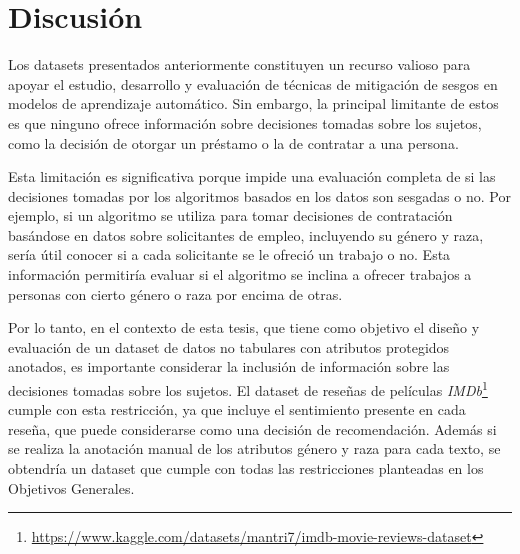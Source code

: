 \section{Discusi\'on}

Los datasets presentados anteriormente constituyen un recurso valioso para apoyar el estudio, desarrollo y evaluaci\'on de t\'ecnicas de 
mitigaci\'on de sesgos en modelos de aprendizaje autom\'atico. Sin embargo, la principal limitante de estos es que ninguno ofrece 
informaci\'on sobre decisiones tomadas sobre los sujetos, como la decisi\'on de otorgar un pr\'estamo o la de contratar a una persona.

Esta limitaci\'on es significativa porque impide una evaluaci\'on completa de si las decisiones tomadas por los algoritmos basados 
en los datos son sesgadas o no. Por ejemplo, si un algoritmo se utiliza para tomar decisiones de contrataci\'on bas\'andose en datos
sobre solicitantes de empleo, incluyendo su g\'enero y raza, ser\'ia \'util conocer si a cada solicitante se le ofreci\'o 
un trabajo o no. Esta informaci\'on permitir\'ia evaluar si el algoritmo se inclina a ofrecer trabajos a personas con cierto g\'enero o raza
por encima de otras.

Por lo tanto, en el contexto de esta tesis, que tiene como objetivo el dise\~no y evaluaci\'on de un dataset de datos no tabulares
con atributos protegidos anotados, es importante considerar la inclusi\'on de informaci\'on sobre las decisiones tomadas sobre los sujetos.
El dataset de rese\~nas de pel\'iculas \emph{IMDb}\footnote{\url{https://www.kaggle.com/datasets/mantri7/imdb-movie-reviews-dataset}}
cumple con esta restricci\'on, ya que incluye el sentimiento presente en cada rese\~na, que puede considerarse como una decisi\'on de 
recomendaci\'on. Adem\'as si se realiza la anotaci\'on manual de los atributos g\'enero y raza para cada texto, se obtendr\'ia un dataset
que cumple con todas las restricciones planteadas en los Objetivos Generales.